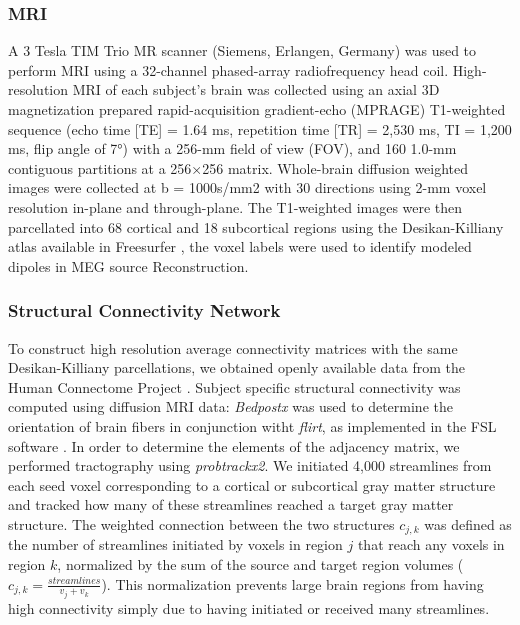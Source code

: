 \subsubsection{MRI}
A 3 Tesla TIM Trio MR scanner (Siemens, Erlangen, Germany) was used to perform MRI using a 32-channel phased-array radiofrequency head coil. High-resolution MRI of each subject's brain was collected using an axial 3D magnetization prepared rapid-acquisition gradient-echo (MPRAGE) T1-weighted sequence (echo time [TE] = 1.64 ms, repetition time [TR] = 2,530 ms, TI = 1,200 ms, flip angle of 7°) with a 256-mm field of view (FOV), and 160 1.0-mm contiguous partitions at a 256×256 matrix. Whole-brain diffusion weighted images were collected at b = 1000s/mm2 with 30 directions using 2-mm voxel resolution in-plane and through-plane. The T1-weighted images were then parcellated into 68 cortical and 18 subcortical regions using the Desikan-Killiany atlas available in Freesurfer \cite{Fischl2012, Desikan2006}, the voxel labels were used to identify modeled dipoles in MEG source Reconstruction.

\subsubsection{Structural Connectivity Network}
To construct high resolution average connectivity matrices with the same Desikan-Killiany parcellations, we obtained openly available data from the Human Connectome Project \cite{McNab2013}. Subject specific structural connectivity was computed using diffusion MRI data: \emph{Bedpostx} was used to determine the orientation of brain fibers in conjunction witht \emph{flirt}, as implemented in the FSL software \cite{jenkinson_fsl_2012}. In order to determine the elements of the adjacency matrix, we performed tractography using \emph{probtrackx2}. We initiated 4,000 streamlines from each seed voxel corresponding to a cortical or subcortical gray matter structure and tracked how many of these streamlines reached a target gray matter structure. The weighted connection between the two structures $c_{j,k}$ was defined as the number of streamlines initiated by voxels in region $j$ that reach any voxels in region $k$, normalized by the sum of the source and target region volumes ($c_{j,k} = \frac{streamlines}{v_j + v_k}$). This normalization prevents large brain regions from having high connectivity simply due to having initiated or received many streamlines.

